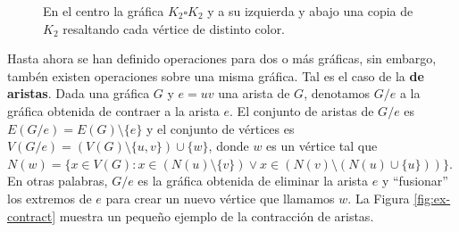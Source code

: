 \begin{figure}[ht!]
    \centering
        \caption{En el centro la gr\'afica $K_2 \square K_2$ y a su izquierda y 
        abajo una copia de $K_2$ resaltando cada v\'ertice de distinto color.}
        \label{fig:ex-cartesiano}
    \end{figure}

Hasta ahora se han definido operaciones para dos o m\'as gr\'aficas, sin embargo,
tamb\'en existen operaciones sobre una misma gr\'afica. Tal es el caso de la
 \textbf{de aristas}. Dada una gr\'afica $G$ y
$e=uv$ una arista de $G$, denotamos $G/e$ a la gr\'afica obtenida de contraer a
la arista $e$. El conjunto de aristas de $G/e$ es $ E(G/e)=E(G) \setminus \{e\}$
y el conjunto de v\'ertices es $V(G/e)=(V(G)\setminus \{u,v\}) \cup \{w\}$,
donde $w$ es un v\'ertice tal que $N(w)=\{x \in V(G) \colon x \in (N(u)\setminus
\{v\}) \lor x \in (N(v) \setminus (N(u) \cup \{u\}))\}$. En otras palabras, $G/e$ es la
gr\'afica obtenida de eliminar la arista $e$ y ``fusionar'' los extremos de $e$
para crear un nuevo v\'ertice que llamamos $w$. La Figura \ref{fig:ex-contract}
muestra un peque\~{n}o ejemplo de la contracci\'on de aristas.

